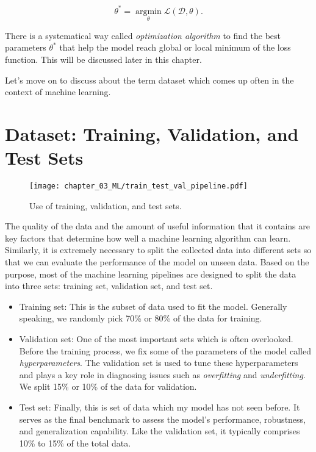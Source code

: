 \begin{equation}
    \theta^* = \operatorname*{argmin}_\theta \mathcal{L}(\mathcal{D}, \theta).
\end{equation}

There is a systematical way called \textit{optimization algorithm} to find the best parameters $\theta^*$ that help the model reach global or local minimum of the loss function. This will be discussed later in this chapter. 

Let's move on to discuss about the term dataset which comes up often in the context of machine learning.

\section{Dataset: Training, Validation, and Test Sets}

\begin{figure}[t]
    \centering
    \texttt{[image: chapter\_03\_ML/train\_test\_val\_pipeline.pdf]}
    \caption{Use of training, validation, and test sets.}
    \label{fig:dataset_split}
\end{figure}

The quality of the data and the amount of useful information that it contains are key factors that determine how well a machine learning algorithm can learn. Similarly, it is extremely necessary to split the collected data into different sets so that we can evaluate the performance of the model on unseen data. Based on the purpose, most of the machine learning pipelines are designed to split the data into three sets: training set, validation set, and test set.

\begin{itemize}
    \item Training set: This is the subset of data used to fit the model. Generally speaking, we randomly pick 70\% or 80\% of the data for training.
    \item Validation set: One of the most important sets which is often overlooked. Before the training process, we fix some of the parameters of the model called \textit{hyperparameters}. The validation set is used to tune these hyperparameters and plays a key role in diagnosing issues such as \textit{overfitting} and \textit{underfitting}. We split 15\% or 10\% of the data for validation.
    \item Test set: Finally, this is set of data which my model has not seen before. It serves as the final benchmark to assess the model’s performance, robustness, and generalization capability. Like the validation set, it typically comprises 10\% to 15\% of the total data. 
\end{itemize}

